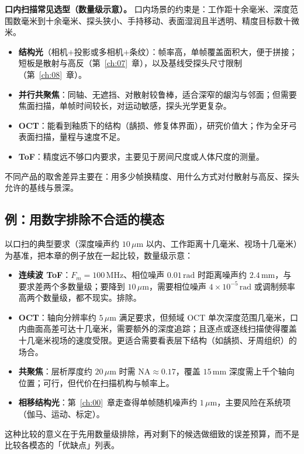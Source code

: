 \textbf{口内扫描常见选型（数量级示意）。} 口内场景的约束是：工作距十余毫米、深度范围数毫米到十余毫米、探头狭小、手持移动、表面湿润且半透明、精度目标数十微米。
\begin{itemize}
  \item \textbf{结构光}（相机+投影或多相机+条纹）：帧率高，单帧覆盖面积大，便于拼接；短板是散射与高反（第~\ref{ch:07}~章），以及基线受探头尺寸限制（第~\ref{ch:08}~章）。
  \item \textbf{并行共聚焦}：同轴、无遮挡、对散射较鲁棒，适合深窄的龈沟与邻面；但需要焦面扫描，单帧时间较长，对运动敏感，探头光学更复杂。
  \item \textbf{OCT}：能看到釉质下的结构（龋损、修复体界面），研究价值大；作为全牙弓表面扫描，量程与速度不足。
  \item \textbf{ToF}：精度远不够口内要求，主要见于房间尺度或人体尺度的测量。
\end{itemize}
不同产品的取舍差异主要在：用多少帧换精度、用什么方式对付散射与高反、探头允许的基线与景深。

\subsection{例：用数字排除不合适的模态}

以口扫的典型要求（深度噪声约 $10\,\mu\mathrm{m}$ 以内、工作距离十几毫米、视场十几毫米）为基准，把本章的例子放在一起比较，数量级示意：
\begin{itemize}
  \item \textbf{连续波 ToF}：$F_m=100\,\mathrm{MHz}$、相位噪声 $0.01\,\mathrm{rad}$ 时距离噪声约 $2.4\,\mathrm{mm}$，与要求差两个多数量级；要降到 $10\,\mu\mathrm{m}$，需要相位噪声 $4\times10^{-5}\,\mathrm{rad}$ 或调制频率高两个数量级，都不现实。排除。
  \item \textbf{OCT}：轴向分辨率约 $5\,\mu\mathrm{m}$ 满足要求，但频域 OCT 单次深度范围几毫米，口内曲面高差可达十几毫米，需要额外的深度追踪；且逐点或逐线扫描使得覆盖十几毫米视场的速度受限。更适合需要看表层下结构（如龋损、牙周组织）的场合。
  \item \textbf{共聚焦}：层析厚度约 $20\,\mu\mathrm{m}$ 时需 $\mathrm{NA}\approx0.17$，覆盖 $15\,\mathrm{mm}$ 深度需上千个轴向位置；可行，但代价在扫描机构与帧率上。
  \item \textbf{相移结构光}：第~\ref{ch:00}~章走查得单帧随机噪声约 $1\,\mu\mathrm{m}$，主要风险在系统项（伽马、运动、标定）。
\end{itemize}
这种比较的意义在于先用数量级排除，再对剩下的候选做细致的误差预算，而不是比较各模态的「优缺点」列表。

